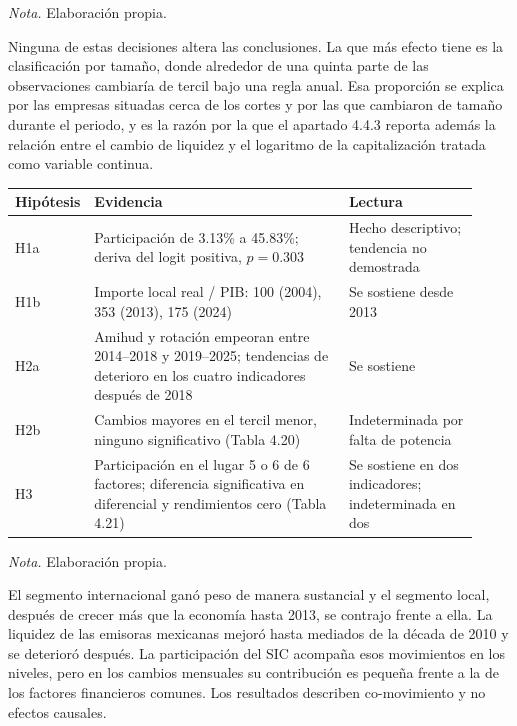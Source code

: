 \emph{Nota.} Elaboración propia.

Ninguna de estas decisiones altera las conclusiones. La que más efecto tiene es la clasificación por tamaño, donde alrededor de una quinta parte de las observaciones cambiaría de tercil bajo una regla anual. Esa proporción se explica por las empresas situadas cerca de los cortes y por las que cambiaron de tamaño durante el periodo, y es la razón por la que el apartado 4.4.3 reporta además la relación entre el cambio de liquidez y el logaritmo de la capitalización tratada como variable continua.


\begin{center}\small
\begin{tabular}{@{}p{0.09\linewidth}p{0.55\linewidth}p{0.28\linewidth}@{}}\toprule
Hipótesis & Evidencia & Lectura\\\midrule
H1a & Participación de 3.13\% a 45.83\%; deriva del logit positiva, $p=0.303$ & Hecho descriptivo; tendencia no demostrada\\
H1b & Importe local real / PIB: 100 (2004), 353 (2013), 175 (2024) & Se sostiene desde 2013\\
H2a & Amihud y rotación empeoran entre 2014--2018 y 2019--2025; tendencias de deterioro en los cuatro indicadores después de 2018 & Se sostiene\\
H2b & Cambios mayores en el tercil menor, ninguno significativo (Tabla 4.20) & Indeterminada por falta de potencia\\
H3 & Participación en el lugar 5 o 6 de 6 factores; diferencia significativa en diferencial y rendimientos cero (Tabla 4.21) & Se sostiene en dos indicadores; indeterminada en dos\\\bottomrule
\end{tabular}
\end{center}
\emph{Nota.} Elaboración propia.

El segmento internacional ganó peso de manera sustancial y el segmento local, después de crecer más que la economía hasta 2013, se contrajo frente a ella. La liquidez de las emisoras mexicanas mejoró hasta mediados de la década de 2010 y se deterioró después. La participación del SIC acompaña esos movimientos en los niveles, pero en los cambios mensuales su contribución es pequeña frente a la de los factores financieros comunes. Los resultados describen co-movimiento y no efectos causales.


